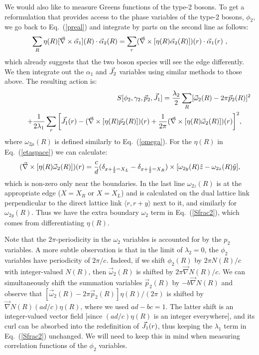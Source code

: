 We would also like to measure Greens functions of the type-2 bosons.  To get a reformulation that provides access to the phase variables of the type-2 bosons, $\phi_2$, we go back to Eq.~(\ref{preal}) and integrate by parts on the second line as follows:
\begin{eqnarray}
 \sum_R \eta(R) [\vec{\nabla}\times\vec{\alpha}_{1}](R) \cdot \vec{\alpha}_{2}(R) 
= \sum_r (\vec{\nabla}\times[\eta(R)\vec{\alpha}_2(R)])(r)\cdot \vec{\alpha}_1(r) ~,
\end{eqnarray}
which already suggests that the two boson species will see the edge differently.
We then integrate out the $\alpha_1$ and $\vec{J}_2$ variables using similar methods to those above. The resulting action is:
\begin{eqnarray}
&&S[\phi_2,\gamma_2,\vec{p}_2,\vec{J}_1]=
\frac{\lambda_2}{2}\sum_R [\vec{\omega}_{2}(R)-2\pi \vec{p}_{2}(R)]^2\nonumber\\
&&~~~~~+\frac{1}{2\lambda_1}\sum_r \bigg[\vec{J}_1(r)-(\vec{\nabla}\times[\eta(R)\vec{p}_2(R)])(r)
+ \frac{1}{2\pi}(\vec{\nabla}\times[\eta(R)\vec{\omega}_2(R)])(r) \bigg]^2 , ~~~~
\label{Sfrac2}
\end{eqnarray}
where $\omega_{2\mu}(R)$ is defined similarly to Eq.~(\ref{omega}). For the $\eta(R)$ in Eq.~(\ref{etaspace}) we can calculate:
\begin{eqnarray}
(\vec{\nabla}\times[\eta(R)\vec{\omega}_{2}(R)])(r) 
 = \frac{c}{d}(\delta_{x+\frac{1}{2}=X_L}-\delta_{x+\frac{1}{2}=X_R})\times
[\omega_{2y}(R)\hat{z}
-\omega_{2z}(R)\hat{y}]\nonumber,
\end{eqnarray}
which is non-zero only near the boundaries.  In the last line $\omega_{2z}(R)$ is at the appropriate edge ($X=X_R$ or $X=X_L$) and is calculated on the dual lattice link perpendicular to the direct lattice link $\langle r, r+\hat{y}\rangle$ next to it, and similarly for $\omega_{2y}(R)$.
Thus we have the extra boundary $\omega_2$ term in Eq.~(\ref{Sfrac2}), which comes from differentiating $\eta(R)$. 

Note that the $2\pi$-periodicity in the $\omega_2$ variables is accounted for by the $p_2$ variables.  A more subtle observation is that in the limit of $\lambda_2 = 0$, the $\phi_2$ variables have periodicity of $2\pi/c$.  Indeed, if we shift $\phi_2(R)$ by $2\pi N(R)/c$ with integer-valued $N(R)$, then $\vec{\omega}_2(R)$ is shifted by $2\pi \vec{\nabla}N(R)/c$.  We can simultaneously shift the summation variables $\vec{p}_2(R)$ by $-b\vec{\nabla}N(R)$ and observe that $[\vec{\omega}_2(R) - 2\pi \vec{p}_2(R)] \eta(R)/(2\pi)$ is shifted by $\vec{\nabla}N(R) (ad/c)\eta(R)$, where we used $ad - bc = 1$.  The latter shift is an integer-valued vector field [since $(ad/c)\eta(R)$ is an integer everywhere], and its curl can be absorbed into the redefinition of ${\vec{J}}_1(r)$, thus keeping the $\lambda_1$ term in Eq.~(\ref{Sfrac2}) unchanged.  We will need to keep this in mind when measuring correlation functions of the $\phi_2$ variables.

